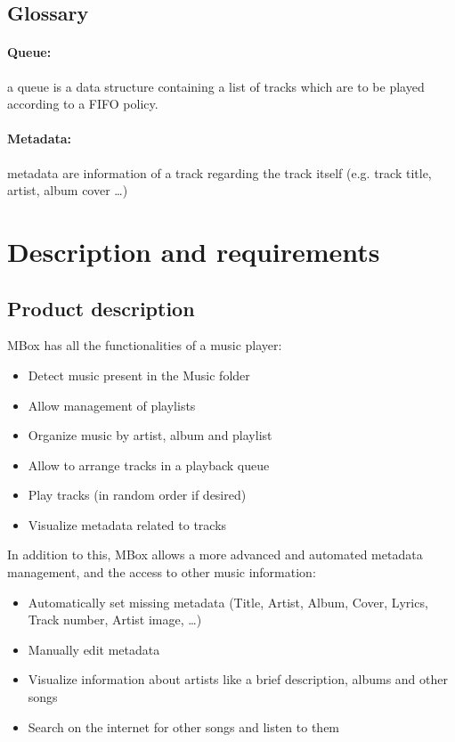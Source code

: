 \documentclass{article}
\begin{document}
\subsection{Glossary}
\paragraph{Queue:} a queue is a data structure containing a list of tracks
which are to be played according to a FIFO policy.
\paragraph{Metadata: } metadata are information of a track regarding the track
itself (e.g. track title, artist, album cover \ldots)

\newpage

\section{Description and requirements}
\subsection{Product description}
MBox has all the functionalities of a music player:
\begin{itemize}
    \item Detect music present in the Music folder
    \item Allow management of playlists
    \item Organize music by artist, album and playlist
    \item Allow to arrange tracks in a playback queue
    \item Play tracks (in random order if desired)
    \item Visualize metadata related to tracks
\end{itemize}
In addition to this, MBox allows a more advanced and automated metadata
management, and the access to other music information:
\begin{itemize}
    \item Automatically set missing metadata (Title, Artist, Album, Cover,
        Lyrics, Track number, Artist image, \ldots)
    \item Manually edit metadata
    \item Visualize information about artists like a brief description, albums
        and other songs
    \item Search on the internet for other songs and listen to them
\end{itemize}
\end{document}
